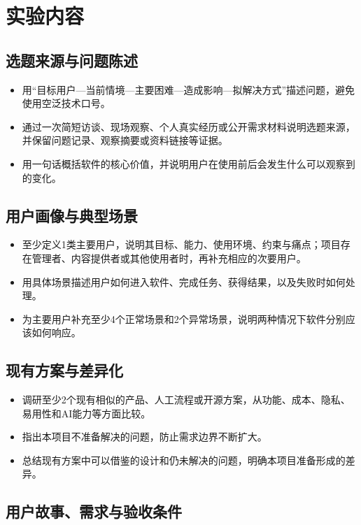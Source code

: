 \documentclass[UTF8,12pt,a4paper]{ctexart}
\begin{document}
\section{实验内容}

\subsection{选题来源与问题陈述}

\begin{itemize}
  \item 用“目标用户—当前情境—主要困难—造成影响—拟解决方式”描述问题，避免使用空泛技术口号。
  \item 通过一次简短访谈、现场观察、个人真实经历或公开需求材料说明选题来源，并保留问题记录、观察摘要或资料链接等证据。
  \item 用一句话概括软件的核心价值，并说明用户在使用前后会发生什么可以观察到的变化。
\end{itemize}

\subsection{用户画像与典型场景}

\begin{itemize}
  \item 至少定义1类主要用户，说明其目标、能力、使用环境、约束与痛点；项目存在管理者、内容提供者或其他使用者时，再补充相应的次要用户。
  \item 用具体场景描述用户如何进入软件、完成任务、获得结果，以及失败时如何处理。
  \item 为主要用户补充至少4个正常场景和2个异常场景，说明两种情况下软件分别应该如何响应。
\end{itemize}

\subsection{现有方案与差异化}

\begin{itemize}
  \item 调研至少2个现有相似的产品、人工流程或开源方案，从功能、成本、隐私、易用性和AI能力等方面比较。
  \item 指出本项目不准备解决的问题，防止需求边界不断扩大。
  \item 总结现有方案中可以借鉴的设计和仍未解决的问题，明确本项目准备形成的差异。
\end{itemize}

\subsection{用户故事、需求与验收条件}
\end{document}
